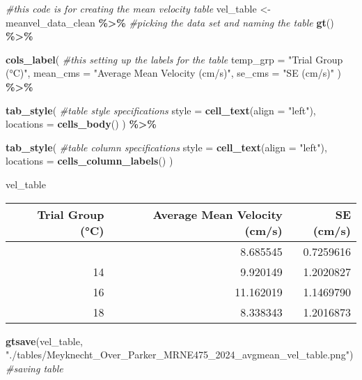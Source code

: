 \documentclass[
]{article}
\newenvironment{Shaded}{\begin{snugshade}}{\end{snugshade}}
\newcommand{\AttributeTok}[1]{\textcolor[rgb]{0.13,0.29,0.53}{#1}}
\newcommand{\CommentTok}[1]{\textcolor[rgb]{0.56,0.35,0.01}{\textit{#1}}}
\newcommand{\FunctionTok}[1]{\textcolor[rgb]{0.13,0.29,0.53}{\textbf{#1}}}
\newcommand{\NormalTok}[1]{#1}
\newcommand{\OtherTok}[1]{\textcolor[rgb]{0.56,0.35,0.01}{#1}}
\newcommand{\SpecialCharTok}[1]{\textcolor[rgb]{0.81,0.36,0.00}{\textbf{#1}}}
\newcommand{\StringTok}[1]{\textcolor[rgb]{0.31,0.60,0.02}{#1}}
\begin{document}
\begin{Shaded}
\begin{Highlighting}[]
\CommentTok{\#this code is for creating the mean velocity table}
\NormalTok{vel\_table }\OtherTok{\textless{}{-}}\NormalTok{ meanvel\_data\_clean }\SpecialCharTok{\%\textgreater{}\%}  \CommentTok{\#picking the data set and naming the table}
  \FunctionTok{gt}\NormalTok{() }\SpecialCharTok{\%\textgreater{}\%}

  \FunctionTok{cols\_label}\NormalTok{(  }\CommentTok{\#this setting up the labels for the table }
    \AttributeTok{temp\_grp =} \StringTok{"Trial Group (°C)"}\NormalTok{,  }
    \AttributeTok{mean\_cms =} \StringTok{"Average Mean Velocity (cm/s)"}\NormalTok{,          }
    \AttributeTok{se\_cms =} \StringTok{"SE (cm/s)"}            
\NormalTok{  ) }\SpecialCharTok{\%\textgreater{}\%}
 
  \FunctionTok{tab\_style}\NormalTok{( }\CommentTok{\#table style specifications }
    \AttributeTok{style =} \FunctionTok{cell\_text}\NormalTok{(}\AttributeTok{align =} \StringTok{"left"}\NormalTok{),}
    \AttributeTok{locations =} \FunctionTok{cells\_body}\NormalTok{()}
\NormalTok{  ) }\SpecialCharTok{\%\textgreater{}\%}

  \FunctionTok{tab\_style}\NormalTok{( }\CommentTok{\#table column specifications}
    \AttributeTok{style =} \FunctionTok{cell\_text}\NormalTok{(}\AttributeTok{align =} \StringTok{"left"}\NormalTok{),}
    \AttributeTok{locations =} \FunctionTok{cells\_column\_labels}\NormalTok{()}
\NormalTok{  )}

\NormalTok{vel\_table}
\end{Highlighting}
\end{Shaded}

\begin{table}[!t]
\fontsize{12.0pt}{14.4pt}\selectfont
\begin{tabular*}{\linewidth}{@{\extracolsep{\fill}}rrr}
\toprule
Trial Group (°C) & Average Mean Velocity (cm/s) & SE (cm/s) \\ 
\midrule\addlinespace[2.5pt]
{12} & {8.685545} & {0.7259616} \\ 
{14} & {9.920149} & {1.2020827} \\ 
{16} & {11.162019} & {1.1469790} \\ 
{18} & {8.338343} & {1.2016873} \\ 
\bottomrule
\end{tabular*}
\end{table}

\begin{Shaded}
\begin{Highlighting}[]
\FunctionTok{gtsave}\NormalTok{(vel\_table, }\StringTok{"./tables/Meyknecht\_Over\_Parker\_MRNE475\_2024\_avgmean\_vel\_table.png"}\NormalTok{) }\CommentTok{\#saving table}
\end{Highlighting}
\end{Shaded}
\end{document}
